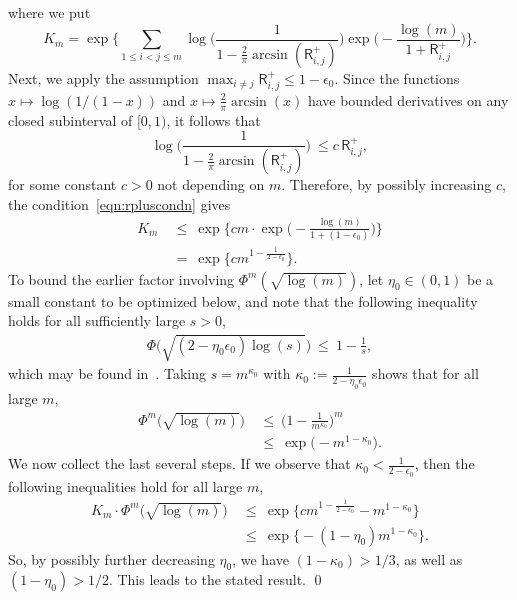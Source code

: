 \documentclass[aos,preprint]{imsart}
\numberwithin{equation}{section}
\theoremstyle{plain}
\newcommand{\e}{\epsilon}
\newcommand{\ts}{\textstyle}
\newcommand{\1}{{\bf{1}}}
\newcommand{\0}{\mathbf{0}}
\begin{document}
where we put
$$K_m=  \exp\Bigg\{\sum_{1\leq i<j\leq m} \log\Big(\ts\frac{1}{1-\frac{2}{\pi}\arcsin(\mathsf{R}_{i,j}^+)}\Big)\exp\Big(-\ts\frac{\log(m)}{1+\mathsf{R}_{i,j}^+}\Big)\Bigg\}.$$
Next, we apply the assumption  $\max_{i\neq j}\mathsf{R}_{i,j}^+\leq 1-\e_0$. Since the functions $x\mapsto \log(1/(1-x))$ and  $x\mapsto\frac{2}{\pi}\arcsin(x)$ have bounded derivatives on any closed subinterval of $[0,1)$,  it follows that
 $$\log\Big(\ts\frac{1}{1-\frac{2}{\pi}\arcsin(\mathsf{R}_{i,j}^+)}\Big) \ \leq c\, \mathsf{R}_{i,j}^+,$$
 for some constant $c>0$ not depending on $m$. Therefore, by possibly increasing $c$, the condition~\eqref{eqn:rpluscondn} gives
\begin{equation}
\begin{split}
K_m
%
& \ \leq \ \exp\Big\{ cm \cdot \exp\Big(-\ts\frac{\log(m)}{1+(1-\e_0)}\Big)\Big\}\\[0.3cm]
%
& \ = \ \exp\Big\{cm^{1-\frac{1}{2-\e_0}}\Big\}.
\end{split}
\end{equation}
To bound the earlier factor involving $\Phi^m(\sqrt{\log(m)})$, let $\eta_0\in(0,1)$ be a small constant to be optimized below, and note that the following inequality holds for all sufficiently large $s>0$,
\begin{equation}\label{numericalineq}
\begin{split}
\Phi\Big(\sqrt{(2-\eta_0\e_0)\log(s)}\Big) \ \leq \ 1-\ts\frac{1}{s},
\end{split}
 \end{equation}
%
which may be found in~\cite[p.337]{Massart:2013}. Taking $s=m^{\kappa_0}$ with $\kappa_0:=\frac{1}{2-\eta_0\e_0}$ shows that for all large $m$,
\begin{equation}
\begin{split}
\Phi^{m}\big(\sqrt{\log(m)}\big) & \ \leq  \ \Big(1-\ts\frac{1}{m^{\kappa_0}}\Big)^{m}\\[0.3cm]
%
%
& \ \leq \ \exp\big(-m^{1-\kappa_0}\big).
%
\end{split}
\end{equation}
We now collect the last several steps. If we observe that $\kappa_0<\frac{1}{2-\e_0}$, then the following inequalities hold for all large $m$,
\begin{equation}
\begin{split}
  K_m\cdot \Phi^{m}\big( \sqrt{\log(m)}\big) & \ \leq \ \exp\Big\{cm^{1-\frac{1}{2-\e_0}}-m^{1-\kappa_0}\Big\}\\[0.3cm]
  & \ \leq \ \exp\Big\{-(1-\eta_0)m^{1-\kappa_0}\Big\}.
  \end{split}
\end{equation}
So, by possibly further decreasing $\eta_0$, we have $(1-\kappa_0)>1/3$, as well as $(1-\eta_0)>1/2$. This leads to the stated result.
\qed
\end{document}
